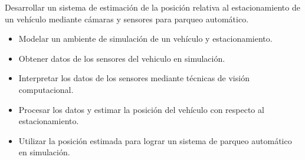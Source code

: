 \newline
\noindent Desarrollar un sistema de estimación de la posición relativa al estacionamiento de un vehículo mediante cámaras y sensores para parqueo automático.
\newline
\newline
{}
\begin{itemize}
    \item Modelar un ambiente de simulación de un vehículo y estacionamiento.
    \item Obtener datos de los sensores del vehiculo en simulación.
    \item Interpretar los datos de los sensores mediante técnicas de visión computacional.
    \item Procesar los datos y estimar la posición del vehículo con respecto al estacionamiento.
    \item Utilizar la posición estimada para lograr un sistema de parqueo automático en simulación.
\end{itemize}